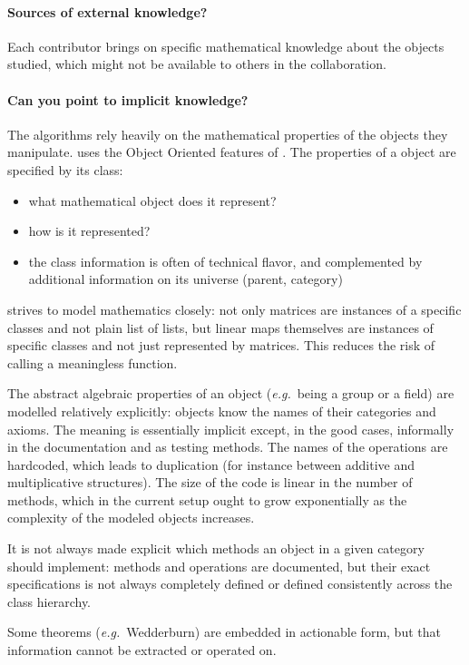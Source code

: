 \paragraph{Sources of external knowledge?}
Each \SageMath contributor brings on specific mathematical knowledge about the objects studied, which might not be available to others in the collaboration.

\paragraph{Can you point to implicit knowledge?}
The algorithms rely heavily on the mathematical properties of the objects they manipulate.
\SageMath uses the Object Oriented features of \python. 
The properties of a \SageMath object are specified by its \python class:
\begin{itemize}
\item what mathematical object does it represent?
\item how is it represented?
\item the class information is often of technical flavor, and complemented
  by additional information on its universe (parent, category)
\end{itemize}

\SageMath strives to model mathematics closely: not only matrices are instances of a specific classes and not plain list of lists,  but linear maps themselves are instances of specific classes and not just represented by matrices. This reduces the  risk of calling a meaningless function. 

The abstract algebraic properties of an object (\emph{e.g.}~being a group or a field) are modelled relatively explicitly: objects know the names of their categories and axioms.  The meaning is essentially implicit except, in the good cases, informally in the documentation and as testing methods. The names of the operations are hardcoded, which leads to duplication (for instance between additive and multiplicative structures). The size of the code is linear in the number of methods, which in the current setup ought to grow exponentially as the complexity of the modeled objects increases. 

It is not always made explicit which methods an object in a given category should implement: methods and operations are documented, but their exact specifications is not always completely defined or defined consistently across the class hierarchy.

Some theorems (\emph{e.g.}~Wedderburn) are embedded in actionable form,  but that information cannot be extracted or operated on.

